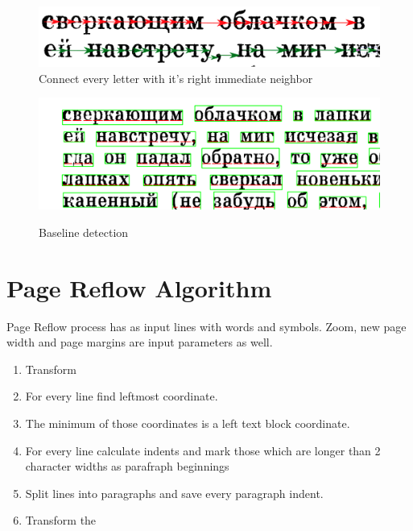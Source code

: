 \documentclass{article}
\begin{document}
\begin{figure}
	\includegraphics[scale=0.3]{connected_letters.png}
	\caption{Connect every letter with it's right immediate neighbor}
	\label{fig:connected_letters}
\end{figure}

\begin{figure}
\includegraphics[width=\textwidth]{baseline.png}
\label{fig:baseline}
\caption{Baseline detection}
\end{figure}

\section{Page Reflow Algorithm}

Page Reflow process has as input lines with words and symbols. Zoom, new page width and page margins are input parameters as well.

\begin{enumerate}
	\item Transform 
	\item For every line find leftmost coordinate.
	\item The minimum of those coordinates is a left text block coordinate.
	\item For every line calculate indents and mark those which are longer than 2 character widths as parafraph beginnings
	\item Split lines into paragraphs and save every paragraph indent.
	\item Transform the 
\end{enumerate}

	
\end{document}
